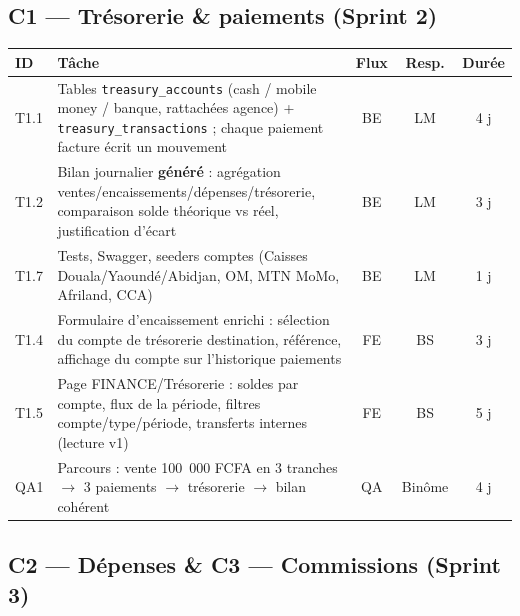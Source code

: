 \documentclass[11pt,a4paper]{article}
\begin{document}
\subsection{C1 --- Trésorerie \& paiements (Sprint 2)}

\begin{tabularx}{\textwidth}{|l|Y|c|c|c|}
\hline
{}\textbf{ID} & \textbf{Tâche} & \textbf{Flux} & \textbf{Resp.} & \textbf{Durée} \\ \hline
T1.1 & Tables \texttt{treasury\_accounts} (cash / mobile money / banque, rattachées agence) + \texttt{treasury\_transactions} ; chaque paiement facture écrit un mouvement & BE & LM & 4 j \\ \hline
T1.2 & Bilan journalier \textbf{généré} : agrégation ventes/encaissements/dépenses/trésorerie, comparaison solde théorique vs réel, justification d'écart & BE & LM & 3 j \\ \hline
T1.7 & Tests, Swagger, seeders comptes (Caisses Douala/Yaoundé/Abidjan, OM, MTN MoMo, Afriland, CCA) & BE & LM & 1 j \\ \hline
T1.4 & Formulaire d'encaissement enrichi : sélection du compte de trésorerie destination, référence, affichage du compte sur l'historique paiements & FE & BS & 3 j \\ \hline
T1.5 & Page FINANCE/Trésorerie : soldes par compte, flux de la période, filtres compte/type/période, transferts internes (lecture v1) & FE & BS & 5 j \\ \hline
QA1 & Parcours : vente 100~000 FCFA en 3 tranches $\rightarrow$ 3 paiements $\rightarrow$ trésorerie $\rightarrow$ bilan cohérent & QA & Binôme & 4 j \\ \hline
\end{tabularx}

\subsection{C2 --- Dépenses \& C3 --- Commissions (Sprint 3)}
\end{document}
